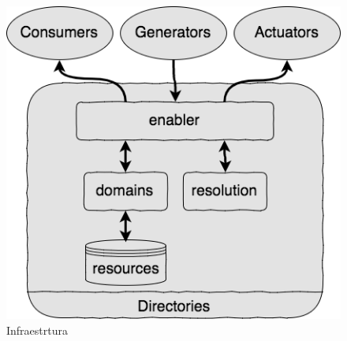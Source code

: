 \begin{figure}[tbh!]
	\centering
	\includegraphics[width=1.0\textwidth]{../images/server-types}
	\caption{Infraestrtura}
	\label{fig:infra}
\end{figure}
